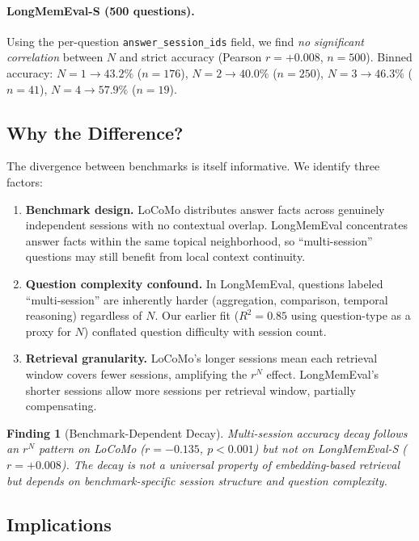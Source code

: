 \documentclass{article}
\newtheorem{finding}{Finding}
\begin{document}
\paragraph{LongMemEval-S (500 questions).}
Using the per-question \texttt{answer\_session\_ids} field, we find \emph{no significant correlation} between $N$ and strict accuracy (Pearson $r = +0.008$, $n = 500$). Binned accuracy: $N{=}1 \to 43.2\%$ ($n{=}176$), $N{=}2 \to 40.0\%$ ($n{=}250$), $N{=}3 \to 46.3\%$ ($n{=}41$), $N{=}4 \to 57.9\%$ ($n{=}19$).

\subsection{Why the Difference?}

The divergence between benchmarks is itself informative. We identify three factors:

\begin{enumerate}
\item \textbf{Benchmark design.} LoCoMo distributes answer facts across genuinely independent sessions with no contextual overlap. LongMemEval concentrates answer facts within the same topical neighborhood, so ``multi-session'' questions may still benefit from local context continuity.
\item \textbf{Question complexity confound.} In LongMemEval, questions labeled ``multi-session'' are inherently harder (aggregation, comparison, temporal reasoning) regardless of $N$. Our earlier fit ($R^2 = 0.85$ using question-type as a proxy for $N$) conflated question difficulty with session count.
\item \textbf{Retrieval granularity.} LoCoMo's longer sessions mean each retrieval window covers fewer sessions, amplifying the $r^N$ effect. LongMemEval's shorter sessions allow more sessions per retrieval window, partially compensating.
\end{enumerate}

\begin{finding}[Benchmark-Dependent Decay]
Multi-session accuracy decay follows an $r^N$ pattern on LoCoMo ($r = -0.135$, $p < 0.001$) but not on LongMemEval-S ($r = +0.008$). The decay is not a universal property of embedding-based retrieval but depends on benchmark-specific session structure and question complexity.
\end{finding}

\subsection{Implications}
\end{document}
